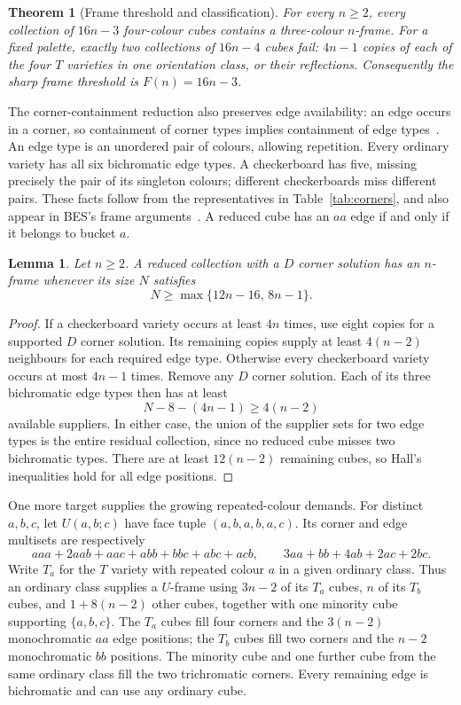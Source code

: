 \documentclass[11pt]{article}
\newtheorem{theorem}{Theorem}
\newtheorem{lemma}{Lemma}
\theoremstyle{remark}
\begin{document}
\begin{theorem}[Frame threshold and classification]\label{thm:frames}
For every $n\ge2$, every collection of $16n-3$ four-colour cubes contains
a three-colour $n$-frame. For a fixed palette, exactly two collections of $16n-4$ cubes
fail: $4n-1$ copies of each of the four $T$ varieties in one orientation
class, or their reflections. Consequently the sharp frame threshold is
$F(n)=16n-3$.
\end{theorem}

The corner-containment reduction also preserves edge availability: an edge
occurs in a corner, so containment of corner types implies containment of
edge types~\cite[Section 2, after Definition 2]{BES}. An edge type is an
unordered pair of colours, allowing repetition. Every ordinary variety has all six bichromatic edge
types. A checkerboard has five, missing precisely the pair of its singleton
colours; different checkerboards miss different pairs. These facts follow
from the representatives in Table~\ref{tab:corners}, and also appear in
BES's frame arguments~\cite[proofs of Lemmas 7--8 and Table 5]{BES}.
A reduced cube has an $aa$ edge if and only if it belongs to bucket $a$.

\begin{lemma}\label{lem:D-extension}
Let $n\ge2$. A reduced collection with a $D$ corner solution has an $n$-frame
whenever its size $N$ satisfies
\[
 N\ge\max\{12n-16,\,8n-1\}.
\]
\end{lemma}
\begin{proof}
If a checkerboard variety occurs at least $4n$ times, use eight copies for
a supported $D$ corner solution. Its remaining copies supply at least
$4(n-2)$ neighbours for each required edge type. Otherwise every
checkerboard variety occurs at most $4n-1$ times. Remove any $D$ corner
solution. Each of its three bichromatic edge types then has at least
\[
 N-8-(4n-1)\ge4(n-2)
\]
available suppliers. In either case, the union of the supplier sets for
two edge types is the entire residual collection, since no reduced cube
misses two bichromatic types. There are at least $12(n-2)$ remaining
cubes, so Hall's inequalities hold for all edge positions.
\end{proof}

One more target supplies the growing repeated-colour demands. For distinct
$a,b,c$, let $U(a,b;c)$ have face tuple $(a,b,a,b,a,c)$. Its corner and edge
multisets are respectively
\[
 aaa+2aab+aac+abb+bbc+abc+acb,
 \qquad 3aa+bb+4ab+2ac+2bc.
\]
Write $T_a$ for the $T$ variety with repeated colour $a$ in a given ordinary
class. Thus an ordinary class supplies a $U$-frame using $3n-2$ of its $T_a$ cubes,
$n$ of its $T_b$ cubes, and $1+8(n-2)$ other cubes, together with one
minority cube supporting $\{a,b,c\}$. The $T_a$ cubes fill four corners and
the $3(n-2)$ monochromatic $aa$ edge positions; the $T_b$ cubes fill two
corners and the $n-2$ monochromatic $bb$ positions. The minority cube and
one further cube from the same ordinary class fill the two trichromatic corners. Every remaining
edge is bichromatic and can use any ordinary cube.
\end{document}
